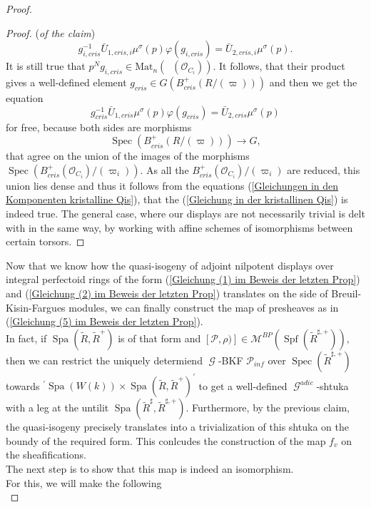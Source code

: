 \documentclass[a4paper,10,5 pt]{amsart}
\theoremstyle{definition}
\DeclareMathOperator{\Spec}{Spec}
\DeclareMathOperator{\Spa}{Spa}
\DeclareMathOperator{\Spf}{Spf}
\DeclareMathOperator{\Acris}{\mathbb{A}_{cris}}
\DeclareMathOperator{\G}{\mathcal{G}}
\begin{document}
\begin{proof}
\begin{proof}{(\textit{of the claim})}
\begin{equation}
g_{i,cris}^{-1}\bar{U}_{1,cris,i}\mu^{\sigma}(p)\varphi(g_{i,cris})=\bar{U}_{2,cris,i}\mu^{\sigma}(p).
\end{equation}
It is still true that $p^{N}g_{i,cris}\in \text{Mat}_{n}(\Acris(\mathcal{O}_{C_{i}})).$  It follows, that their product gives a well-defined element $g_{cris}\in G(B_{cris}^{+}(R/(\varpi)))$ and then we get the equation
\begin{equation}\label{Gleichung in der kristallinen Qis}
g_{cris}^{-1}\bar{U}_{1,cris}\mu^{\sigma}(p)\varphi(g_{cris})=\bar{U}_{2,cris}\mu^{\sigma}(p)
\end{equation}
for free, because both sides are morphisms
$$
\Spec(B_{cris}^{+}(R/(\varpi)))\rightarrow G,
$$
that agree on the union of the images of the morphisms $\Spec(B_{cris}^{+}(\mathcal{O}_{C_{i}})/(\varpi_{i})).$ As all the $B_{cris}^{+}(\mathcal{O}_{C_{i}})/(\varpi_{i})$ are reduced, this union lies dense and thus it follows from the equations (\ref{Gleichungen in den Komponenten kristalline Qis}), that the (\ref{Gleichung in der kristallinen Qis}) is indeed true. The general case, where our displays are not necessarily trivial is delt with in the same way, by working with affine schemes of isomorphisms between certain torsors.
\end{proof}
Now that we know how the quasi-isogeny of adjoint nilpotent displays over integral perfectoid rings of the form (\ref{Gleichung (1) im Beweis der letzten Prop}) and (\ref{Gleichung (2) im Beweis der letzten Prop}) translates on the side of Breuil-Kisin-Fargues modules, we can finally construct the map of presheaves as in (\ref{Gleichung (5) im Beweis der letzten Prop}).
\\
In fact, if $\Spa(\tilde{R},\tilde{R}^{+})$ is of that form and $[\mathcal{P},\rho)]\in \mathcal{M}^{BP}(\Spf(\tilde{R}^{\sharp,+})),$ then we can restrict the uniquely determiend $\G$-BKF $\mathcal{P}_{inf}$ over $\Spec(\tilde{R}^{\sharp,+})$ towards $^{\prime}\Spa(W(k))\times \Spa(\tilde{R},\tilde{R}^{+}) ^{\prime}$ to get a well-defined $\G^{adic}$-shtuka with a leg at the untilit $\Spa(\tilde{R}^{\sharp},\tilde{R}^{\sharp,+}).$ Furthermore, by the previous claim, the quasi-isogeny precisely translates into a trivialization of this shtuka on the boundy of the required form. This conlcudes the construction of the map $f_{v}$ on the sheafifications.
\\
The next step is to show that this map is indeed an isomorphism.
\\
For this, we will make the following
\\

\end{proof}
\end{document}
